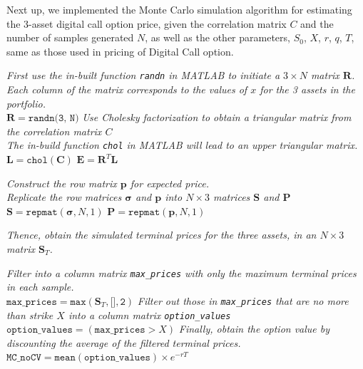 Next up, we implemented the Monte Carlo simulation algorithm for estimating the 3-asset digital call option price, given the correlation matrix $C$ and the number of samples generated $N$, as well as the other parameters, $S_0$, $X$, $r$, $q$, $T$, same as those used in pricing of Digital Call option.

\begin{algorithm}[H]
	\textit{First use the in-built function \emph{\texttt{randn}} in MATLAB to initiate a $3 \times N$ matrix \emph{$\mathbf{R}$.}} \\
	\textit{Each column of the matrix corresponds to the values of $x$ for the 3 assets in the portfolio.} \\
	$\mathbf{R} = \texttt{randn(3, N)}$\;
	\textit{Use Cholesky factorization to obtain a triangular matrix from the correlation matrix $C$} \\
	\textit{The in-build function \emph{\texttt{chol}} in MATLAB will lead to an upper triangular matrix.} \\
	$\mathbf{L} = \texttt{chol}(\mathbf{C})$ \;
	$\mathbf{E} =\mathbf{R}^T \mathbf{L} $ \;
	
	\textit{Construct the row matrix $\mathbf{p}$ for expected price.} \\
	\textit{Replicate the row matrices $\pmb{\sigma}$ and $\mathbf{p}$ into $N \times 3$ matrices $\mathbf{S}$ and $\mathbf{P}$} \\
	$\mathbf{S} = \texttt{repmat}(\pmb{\sigma}, N, 1)$ \;
	$\mathbf{P} = \texttt{repmat}(\mathbf{p}, N, 1)$ \;
	
	\textit{Thence, obtain the simulated terminal prices for the three assets, in an $N \times 3$ matrix $\mathbf{S}_T$.} \\
	
	\textit{Filter into a column matrix \emph{\texttt{max\_prices}} with only the maximum terminal prices in each sample.} \\
	$\texttt{max\_prices} = \texttt{max}(\mathbf{S}_T, \texttt{[]}, \texttt{2})$\;
	\textit{Filter out those in \emph{\texttt{max\_prices}} that are no more than strike $X$ into a column matrix \emph{\texttt{option\_values}}} \\
	$\texttt{option\_values} = (\texttt{max\_prices} > X)$ \;
	\textit{Finally, obtain the option value by discounting the average of the filtered terminal prices.} \\
	$\texttt{MC\_noCV} = \texttt{mean}(\texttt{option\_values}) \times e^{-rT}$ \;
	
\end{algorithm}

